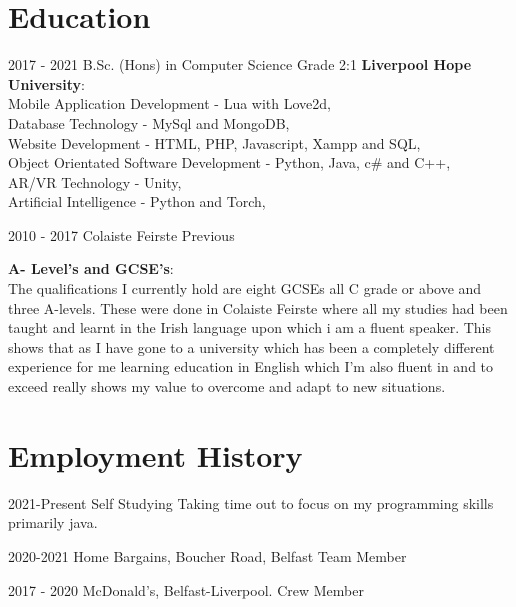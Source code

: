 \documentclass[]{friggeri-cv}
\begin{document}
\section{Education}
\begin{entrylist}
  \entry
    {2017 - 2021}
    {B.Sc. (Hons) in Computer Science}
    {Grade 2:1}
    {\textbf{Liverpool Hope University}:\\ 
    Mobile Application Development - Lua with Love2d,\\
    Database Technology - MySql and MongoDB,\\
    Website Development - HTML, PHP, Javascript, Xampp and SQL,\\
    Object Orientated Software Development - Python, Java, c\# and C++,\\
    AR/VR Technology - Unity,\\
    Artificial Intelligence  - Python and Torch,\\}

  \entry
    {2010 - 2017}
    {Colaiste Feirste}
    {Previous}
    {\textbf{A- Level's and GCSE's}: \\ 
    The qualifications I currently hold are eight GCSEs all C grade or above and three A-levels. These were done in Colaiste Feirste where all my studies had been taught and learnt in the Irish language upon which i am a fluent speaker. This shows that as I have gone to a university which has been a completely different experience for me learning education in English which I'm also fluent in and to exceed really shows my value to overcome and adapt to new situations.

    }
    
\end{entrylist}

\section{Employment History}

\begin{entrylist}
	
	\entry
	{2021-Present}
	{Self Studying}
	{Taking time out to focus on my programming skills primarily java.}
	
	\entry
	{2020-2021}
	{Home Bargains, Boucher Road, Belfast}
	{Team Member}
	
	\entry
	{2017 - 2020}
	{McDonald's, Belfast-Liverpool.}
	{Crew Member}
	
\end{entrylist}
\end{document}
